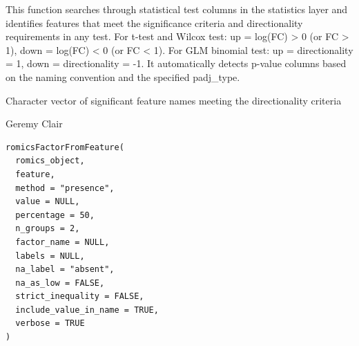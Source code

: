 \documentclass[a4paper]{book}
\begin{document}
%
\begin{Details}
This function searches through statistical test columns in the statistics layer and identifies
features that meet the significance criteria and directionality requirements in any test.
For t-test and Wilcox test: up = log(FC) > 0 (or FC > 1), down = log(FC) < 0 (or FC < 1).
For GLM binomial test: up = directionality = 1, down = directionality = -1.
It automatically detects p-value columns based on the naming convention and the specified padj\_type.
\end{Details}
%
\begin{Value}
Character vector of significant feature names meeting the directionality criteria
\end{Value}
%
\begin{Author}
Geremy Clair
\end{Author}
%
\begin{Usage}
\begin{verbatim}
romicsFactorFromFeature(
  romics_object,
  feature,
  method = "presence",
  value = NULL,
  percentage = 50,
  n_groups = 2,
  factor_name = NULL,
  labels = NULL,
  na_label = "absent",
  na_as_low = FALSE,
  strict_inequality = FALSE,
  include_value_in_name = TRUE,
  verbose = TRUE
)
\end{verbatim}
\end{Usage}
%
\end{document}
